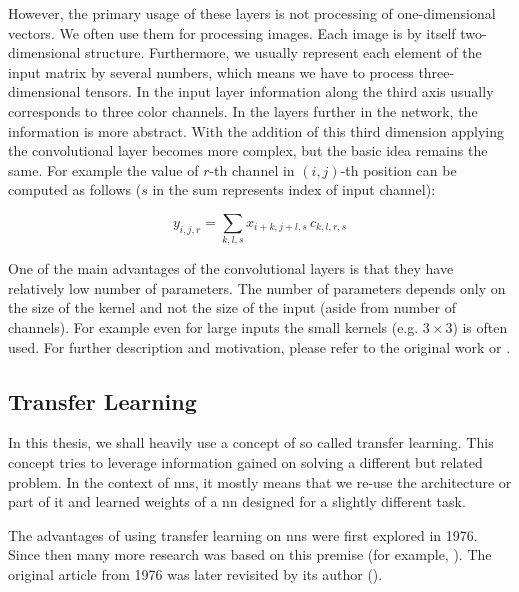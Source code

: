 However, the primary usage of these layers is not processing of one-dimensional vectors. We often use them for processing images. Each image is by itself two-dimensional structure. Furthermore, we usually represent each element of the input matrix by several numbers, which means we have to process three-dimensional tensors. In the input layer information along the third axis usually corresponds to three color channels. In the layers further in the network, the information is more abstract. With the addition of this third dimension applying the convolutional layer becomes more complex, but the basic idea remains the same. For example the value of $r$-th channel in $(i, j)$-th position can be computed as follows ($s$ in the sum represents index of input channel):

$$y_{i, j, r} = \sum_{k, l, s} x_{i+k, j+l, s} \, c_{k, l, r, s}$$

One of the main advantages of the convolutional layers is that they have relatively low number of parameters. The number of parameters depends only on the size of the kernel and not the size of the input (aside from number of channels). For example even for large inputs the small kernels (e.g. $3 \times 3$) is often used. For further description and motivation, please refer to the original work or \cite{deeplearningbook}.

\subsection{Transfer Learning}

\label{ssec:transfer_learning}

In this thesis, we shall heavily use a concept of so called transfer learning. This concept tries to leverage information gained on solving a different but related problem. In the context of \glspl{nn}, it mostly means that we re-use the architecture or part of it and learned weights of a \gls{nn} designed for a slightly different task.


The advantages of using transfer learning on \glspl{nn} were first explored in 1976. Since then many more research was based on this premise (for example, \cite{transferlearning}). The original article from 1976 was later revisited by its author (\cite{transferreviewed}).

